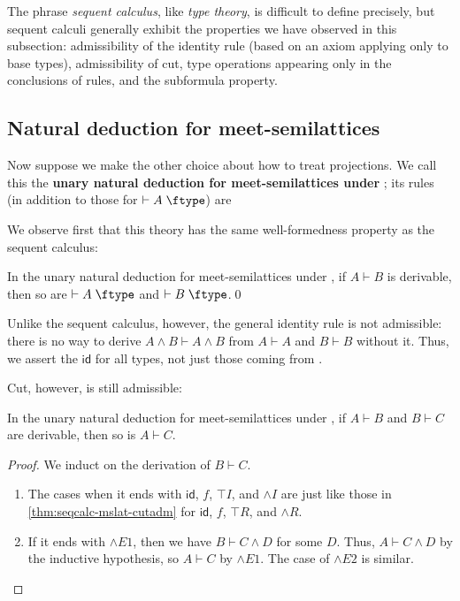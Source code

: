 \documentclass{book}
\def\idfunc{\mathsf{id}}
\let\types\vdash
\def\type{\;\ftype}
\let\meet\wedge
\def\meetR{\mathord{\meet}R}
\def\meetE{\mathord{\meet}E}
\def\meetI{\mathord{\meet}I}
\begin{document}
The phrase \emph{sequent calculus}, like \emph{type theory}, is difficult to define precisely, but sequent calculi generally exhibit the properties we have observed in this subsection: admissibility of the identity rule (based on an axiom applying only to base types), admissibility of cut, type operations appearing only in the conclusions of rules, and the subformula property.

\subsection{Natural deduction for meet-semilattices}
\label{sec:natded-mslat}

Now suppose we make the other choice about how to treat projections.
We call this the \textbf{unary natural deduction for meet-semilattices under \cG}; its rules (in addition to those for $\types A\type$) are

We observe first that this theory has the same well-formedness property as the sequent calculus:

\begin{thm}\label{thm:natded-mslat-wftype}
  In the unary natural deduction for meet-semilattices under \cG, if $A\types B$ is derivable, then so are $\types A\type$ and $\types B\type$.\qed
\end{thm}

Unlike the sequent calculus, however, the general identity rule is not admissible: there is no way to derive $A\meet B \types A\meet B$ from $A\types A$ and $B\types B$ without it.
Thus, we assert the $\idfunc$ for all types, not just those coming from \cG.

Cut, however, is still admissible:

\begin{thm}\label{thm:natded-mslat-cutadm}
  In the unary natural deduction for meet-semilattices under \cG, if $A\types B$ and $B\types C$ are derivable, then so is $A\types C$.
\end{thm}
\begin{proof}
  We induct on the derivation of $B\types C$.
  \begin{enumerate}
  \item The cases when it ends with $\idfunc$, $f$, $\top I$, and $\meetI$ are just like those in \cref{thm:seqcalc-mslat-cutadm} for $\idfunc$, $f$, $\top R$, and $\meetR$.
  \item If it ends with $\meetE1$, then we have $B\types C\meet D$ for some $D$.
    Thus, $A\types C\meet D$ by the inductive hypothesis, so $A\types C$ by $\meetE1$.
    The case of $\meetE2$ is similar.\qedhere
  \end{enumerate}
\end{proof}
\end{document}
